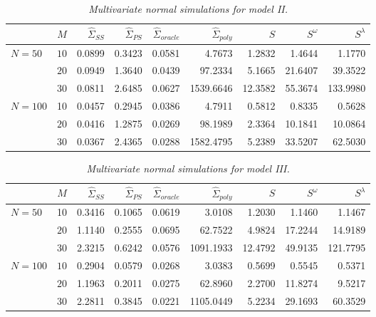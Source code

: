 \begin{table}[H]
\centering
\caption{\textit{Multivariate normal simulations for model II.}}
\begin{tabular}{lrrrrrrrr}
 & $M$ &$\hat{\Sigma}_{SS}$& $\hat{\Sigma}_{PS}$ &$\hat{\Sigma}_{oracle}$& $\hat{\Sigma}_{poly}$ & $S$ &$S^\omega$& $S^\lambda$ \\ 
  \hline
   $N = 50$ & $10$ & 0.0899 & 0.3423 & 0.0581 & 4.7673 & 1.2832 & 1.4644 & 1.1770 \\ 
   & $20$ & 0.0949 & 1.3640 & 0.0439 & 97.2334 & 5.1665 & 21.6407 & 39.3522 \\ 
     & $30$ & 0.0811 & 2.6485 & 0.0627 & 1539.6646 & 12.3582 & 55.3674 & 133.9980 \\ 
  $N = 100$ & 10 & 0.0457 & 0.2945 & 0.0386 & 4.7911 & 0.5812 & 0.8335 & 0.5628 \\ 
    & $20$ & 0.0416 & 1.2875 & 0.0269 & 98.1989 & 2.3364 & 10.1841 & 10.0864 \\ 
    & $30$ & 0.0367 & 2.4365 & 0.0288 & 1582.4795 & 5.2389 & 33.5207 & 62.5030 \\ 
   \hline
\end{tabular}
\label{table:simulation-1-entropy-loss-sigma-2}
\end{table}


%
%


\begin{table}[H]
\centering
\caption{\textit{Multivariate normal simulations for model III.} }
\begin{tabular}{lrrrrrrrr}
 & $M$ &$\hat{\Sigma}_{SS}$& $\hat{\Sigma}_{PS}$ &$\hat{\Sigma}_{oracle}$& $\hat{\Sigma}_{poly}$ & $S$ &$S^\omega$& $S^\lambda$ \\ 
   \hline
 $N = 50$ & 10 & 0.3416 & 0.1065 & 0.0619 & 3.0108 & 1.2030 & 1.1460 & 1.1467 \\ 
      & $20$ & 1.1140 & 0.2555 & 0.0695 & 62.7522 & 4.9824 & 17.2244 & 14.9189 \\ 
    & $30$ & 2.3215 & 0.6242 & 0.0576 & 1091.1933 & 12.4792 & 49.9135 & 121.7795 \\ 
     $N = 100$ & $10$ & 0.2904 & 0.0579 & 0.0268 & 3.0383 & 0.5699 & 0.5545 & 0.5371 \\ 
     & $20$ & 1.1963 & 0.2011 & 0.0275 & 62.8960 & 2.2700 & 11.8274 & 9.5217 \\ 
    & $30$ & 2.2811 & 0.3845 & 0.0221 & 1105.0449 & 5.2234 & 29.1693 & 60.3529 \\ 
   \hline
\end{tabular}
\label{table:simulation-1-entropy-loss-sigma-3}
\end{table}

